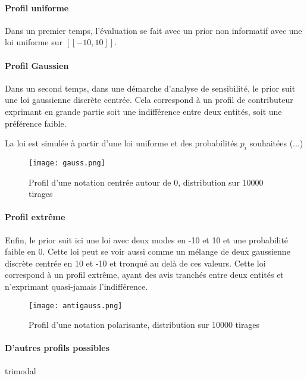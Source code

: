 \paragraph{Profil uniforme}

Dans un premier temps, l'évaluation se fait avec un prior non informatif avec une loi uniforme sur $[\![-10,10]\!]$.

\paragraph{Profil Gaussien}

Dans un second temps, dans une démarche d'analyse de sensibilité, le prior suit une loi gaussienne discrète centrée. Cela correspond à un profil de contributeur exprimant en grande partie soit une indifférence entre deux entités, soit une préférence faible.

La loi est simulée à partir d'une loi uniforme et des probabilités $p_i$ souhaitées (...)

\begin{figure}[ht]
  \texttt{[image: gauss.png]}
  \caption{Profil d'une notation centrée autour de 0, distribution sur 10000 tirages}
\end{figure}



\paragraph{Profil extrême}
Enfin, le prior suit ici une loi avec deux modes en -10 et 10 et une probabilité faible en 0. Cette loi peut se voir aussi comme un mélange de deux gaussienne discrète centrée en 10 et -10 et tronqué au delà de ces valeurs. Cette loi correspond à un profil extrême, ayant des avis tranchés entre deux entités et n'exprimant quasi-jamais l'indifférence.

\begin{figure}[ht]
  \texttt{[image: antigauss.png]}
  \caption{Profil d'une notation polarisante, distribution sur 10000 tirages}
\end{figure}

\paragraph{D'autres profils possibles}

trimodal

